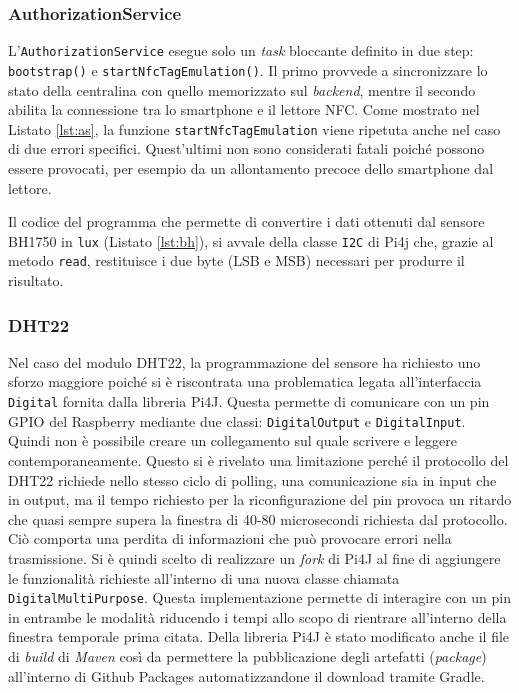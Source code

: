 \subsubsection{AuthorizationService}
L'\texttt{AuthorizationService} esegue solo un \textit{task} bloccante definito in due step: \texttt{bootstrap()} e \texttt{startNfcTagEmulation()}. Il primo provvede a sincronizzare lo stato della centralina con quello memorizzato sul \textit{backend}, mentre il secondo abilita la connessione tra lo smartphone e il lettore NFC. Come mostrato nel Listato \ref*{lst:as}, la funzione \texttt{startNfcTagEmulation} viene ripetuta anche nel caso di due errori specifici. Quest'ultimi non sono considerati fatali poiché possono essere provocati, per esempio da un allontamento precoce dello smartphone dal lettore.

%
Il codice del programma che permette di convertire i dati ottenuti dal sensore BH1750 in \texttt{lux} (Listato \ref*{lst:bh}), si avvale della classe \texttt{I2C} di Pi4j che, grazie al metodo \texttt{read}, restituisce i due byte (LSB e MSB) necessari per produrre il risultato.

%
\subsubsection{DHT22}
Nel caso del modulo DHT22, la programmazione del sensore ha richiesto uno sforzo maggiore poiché si è riscontrata una problematica legata all'interfaccia \texttt{Digital} fornita dalla libreria Pi4J. Questa permette di comunicare con un pin GPIO del Raspberry mediante due classi: \texttt{DigitalOutput} e \texttt{DigitalInput}. Quindi non è possibile creare un collegamento sul quale scrivere e leggere contemporaneamente. Questo si è rivelato una limitazione perché il protocollo del DHT22 richiede nello stesso ciclo di polling, una comunicazione sia in input che in output, ma il tempo richiesto per la riconfigurazione del pin provoca un ritardo che quasi sempre supera la finestra di 40-80 microsecondi richiesta dal protocollo. Ciò comporta una perdita di informazioni che può provocare errori nella trasmissione. Si è quindi scelto di realizzare un \textit{fork} di Pi4J al fine di aggiungere le funzionalità richieste all'interno di una nuova classe chiamata \texttt{DigitalMultiPurpose}. Questa implementazione permette di interagire con un pin in entrambe le modalità riducendo i tempi allo scopo di rientrare all'interno della finestra temporale prima citata. Della libreria Pi4J è stato modificato anche il file di \textit{build} di \textit{Maven} così da permettere la pubblicazione degli artefatti (\textit{package}) all'interno di Github Packages automatizzandone il download tramite Gradle.
%
